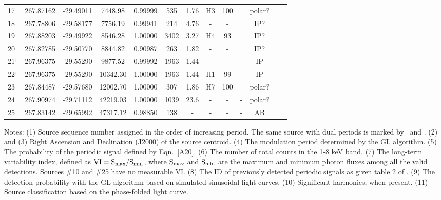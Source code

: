 \documentclass[fleqn,usenatbib]{mnras}
\begin{document}
\begin{table}
\begin{threeparttable}
\begin{tabular}{lcccccccccccc}
\\ 
17 & 267.87162 &	 -29.49011 & 7448.98 & 0.99999  & 535 & 1.76  & H3 & 100 & \text{Second} & polar?
\\
18 & 267.78806 &	 -29.58177 & 7756.19 & 0.99941 & 214  & 4.76 &-&- &\text{Second} & IP?
\\
19 & 267.88203 &	 -29.49922 & 8546.28 & 1.00000  & 3402  & 3.27 &H4 & 93  & \text{Second} & IP?
\\
20 & 267.82785 &	 -29.50770 & 8844.82 & 0.90987 & 263 & 1.82
	&- &- & \text{Second} & IP?
\\
21$^\ddag$ & 267.96375 & -29.55290 & 9877.52 & 0.99992  & 1963 & 1.44 & - &- &- & IP
\\
22$^\ddag$ & 267.96375 & -29.55290 & 10342.30 & 1.00000 & 1963  & 1.44 & H1 & 99 &- & IP 
\\
23 & 267.84487 &	 -29.57680 & 12002.70 & 1.00000 & 307 & 1.86 & H7 & 100 & \text{Second} & polar?
\\
24 & 267.90974 &	-29.71112 & 42219.03 & 1.00000  &1039 &23.6 & - &- &- & polar?
\\
25 & 267.83142 &	 -29.65992 & 47317.12 & 0.98850 & 138  &- &- &- &- & AB
\\
\hline
\end{tabular}
\begin{tablenotes}
      \small
      \item 
      Notes:
      (1) Source sequence number assigned in the order of increasing period. The same source with dual periods is marked by \dag\ and \ddag. 
(2) and (3) Right Ascension and Declination (J2000) of the source centroid. 
(4) The modulation period determined by the GL algorithm.
(5) The probability of the periodic signal defined by Eqn.~\ref{A20}.  
(6) The number of total counts in the 1-8 keV band.
(7) The long-term variability index, defined as $\rm VI=S_{max}/S_{min}$, where $\rm S_{max}$ and $\rm S_{min}$ are the maximum and minimum photon fluxes among all the valid detections. Sources \#10 and \#25 have no measurable VI.
(8) The ID of previously detected periodic signals as given table 2 of \cite{2012ApJ...746..165H}.
(9) The detection probability with the GL algorithm based on simulated sinusoidal light curves.
(10) Significant harmonics, when present.
(11) Source classification based on the phase-folded light curve.
\end{tablenotes}
\end{threeparttable}
\end{table}
\end{document}
